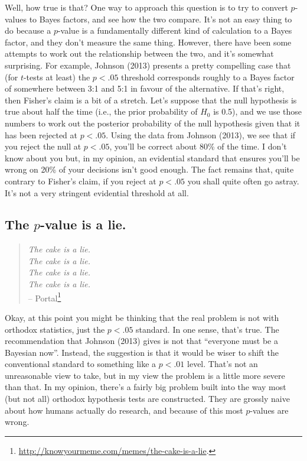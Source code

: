 \documentclass[
  a4paper,
]{book}
\begin{document}
Well, how true is that? One way to approach this question is to try to
convert \(p\)-values to Bayes factors, and see how the two compare. It's
not an easy thing to do because a \(p\)-value is a fundamentally
different kind of calculation to a Bayes factor, and they don't measure
the same thing. However, there have been some attempts to work out the
relationship between the two, and it's somewhat surprising. For example,
Johnson (2013) presents a pretty compelling case that (for \(t\)-tests
at least) the \(p < .05\) threshold corresponds roughly to a Bayes
factor of somewhere between 3:1 and 5:1 in favour of the alternative. If
that's right, then Fisher's claim is a bit of a stretch. Let's suppose
that the null hypothesis is true about half the time (i.e., the prior
probability of \(H_0\) is 0.5), and we use those numbers to work out the
posterior probability of the null hypothesis given that it has been
rejected at \(p < .05\). Using the data from Johnson (2013), we see that
if you reject the null at \(p < .05\), you'll be correct about 80\% of
the time. I don't know about you but, in my opinion, an evidential
standard that ensures you'll be wrong on 20\% of your decisions isn't
good enough. The fact remains that, quite contrary to Fisher's claim, if
you reject at \(p < .05\) you shall quite often go astray. It's not a
very stringent evidential threshold at all.

\hypertarget{the-p-value-is-a-lie.}{%
\subsection{\texorpdfstring{The \(p\)-value is a
lie.}{The p-value is a lie.}}\label{the-p-value-is-a-lie.}}

\begin{quote}
\emph{The cake is a lie.}\\
\emph{The cake is a lie.}\\
\emph{The cake is a lie.}\\
\emph{The cake is a lie.}\\
-- Portal\footnote{\url{http://knowyourmeme.com/memes/the-cake-is-a-lie}.}
\end{quote}

Okay, at this point you might be thinking that the real problem is not
with orthodox statistics, just the \(p < .05\) standard. In one sense,
that's true. The recommendation that Johnson (2013) gives is not that
``everyone must be a Bayesian now''. Instead, the suggestion is that it
would be wiser to shift the conventional standard to something like a
\(p < .01\) level. That's not an unreasonable view to take, but in my
view the problem is a little more severe than that. In my opinion,
there's a fairly big problem built into the way most (but not all)
orthodox hypothesis tests are constructed. They are grossly naive about
how humans actually do research, and because of this most \(p\)-values
are wrong.
\end{document}
